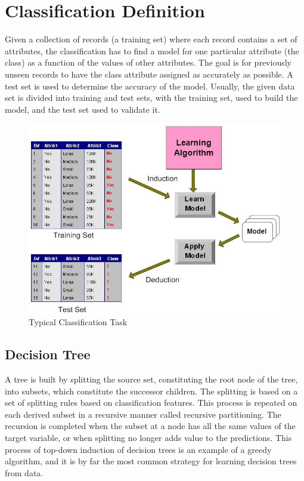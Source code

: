 \section{Classification Definition}
Given a collection of records (a training set) where each record contains a set of attributes, the classification has to find a model for one particular attribute (the class) as a function of the values of other attributes.
The goal is for previously unseen records to have the class attribute assigned as accurately as possible.
A test set is used to determine the accuracy of the model. Usually, the given data set is divided into
training and test sets, with the training set, used to build the model, and the test set used to validate it.

\bigskip
\begin{figure}[H]
    \centering
    \includegraphics[scale=0.5]{figures/classification.jpg}
    \caption{Typical Classification Task}
\end{figure}

\subsection{Decision Tree}

A tree is built by splitting the source set, constituting the root node of the tree, 
into subsets, which constitute the successor children. 
The splitting is based on a set of splitting rules based on classification features. 
This process is repeated on each derived subset in a recursive manner called recursive partitioning. 
The recursion is completed when the subset at a node has all the same values of the target variable, 
or when splitting no longer adds value to the predictions. 
This process of top-down induction of decision trees is an example of a greedy algorithm, 
and it is by far the most common strategy for learning decision trees from data.

